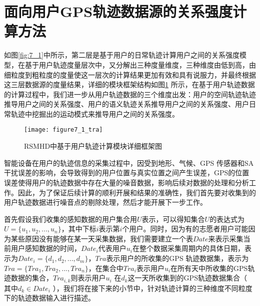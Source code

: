\section{面向用户GPS轨迹数据源的关系强度计算方法}
\label{sec:section4-1}
如图\ref{fig:7_1}中所示，第二层是基于用户的日常轨迹计算用户之间的关系强度模型，在基于用户轨迹度量层次中，又分解出三种度量维度，三种维度由低到高，由细粒度到粗粒度的度量使这一层次的计算结果更加有效和具有说服力，并最终根据这三层数据源的度量结果，详细的模块框架结构如图\ref{fig:7_1_tra} 所示，在基于用户轨迹数据的计算过程中，我们进一步从用户轨迹数据的三个维度出发：用户的空间轨迹轨迹推导用户之间的关系强度、用户的语义轨迹关系推导用户之间的关系强度、用户日常轨迹中挖掘出的运动模式来推导用户之间的关系强度。
\begin{figure}[htp]
\centering
\texttt{[image: figure7\_1\_tra]}
\caption{RSMHD中基于用户轨迹计算模块详细框架图}
\label{fig:7_1_tra}
\end{figure}

\par 智能设备在用户的轨迹信息的采集过程中，因受到地形、气候、GPS 传感器和SA干扰误差的影响，会导致得到的用户位置与真实位置之间产生误差，GPS的位置误差使得用户的轨迹数据中存在大量的噪音数据，影响后续对数据的处理和分析工作。因此，为了保证后续计算的顺利开展和结果的准确性，我们首先要对收集到的用户轨迹数据进行噪音点的剔除处理，然后才能开展下一步工作。
\par 首先假设我们收集的感知数据的用户集合用$U$表示，可以得知集合$U$的表达式为$U=\{u_{1},u_{2},...,u_{n}\}$，其中下标$i$表示第$i$个用户。同时，因为有的志愿者用户可能因为某些原因没有能够在某一天采集数据，我们需要建立一个表$Date$来表示采集当前用户感知数据的时间，$Date_{i}$代表用户$u_{i}$在整个数据采集周期内的具体日期，表示为$Date_{i}=\{d_{1},d_{2},...,d_{m}\}$，$Tra$表示用户的所收集的GPS 轨迹数据集，表示为$Tra=\{Tra_{1},Tra_{2},...,Tra_{n}\}$，在集合中$Tra_{i}$表示用户$u_{i}$在所有天中所收集的GPS轨迹数据的集合，$Tra_{i,k}$则表示用户$u_{i}$ 在$d_{k}$这一天所收集到的GPS轨迹数据集合（ 其中$ d_{k} \in Date_{i}$ ），我们将在接下来的小节中，针对轨迹计算的三种维度不同粒度下的轨迹数据输入进行描述。


